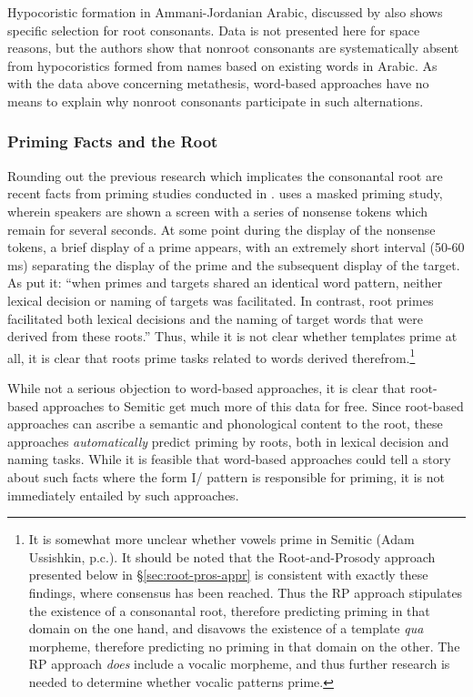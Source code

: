 \documentclass[12pt,twoside,letterpaper]{article}
\begin{document}
Hypocoristic formation in Ammani-Jordanian Arabic, discussed by \cite{davis01} also shows specific selection for root consonants. Data is not presented here for space reasons, but the authors show that nonroot consonants are systematically absent from hypocoristics formed from names based on existing words in Arabic. As with the data above concerning metathesis, word-based approaches have no means to explain why nonroot consonants participate in such alternations.

\subsubsection{Priming Facts and the Root}
\label{sec:priming-facts-root}

Rounding out the previous research which implicates the consonantal root are recent facts from priming studies conducted in \cite{frost97,deutsch98}. \cite{frost97} uses a masked priming study, wherein speakers are shown a screen with a series of nonsense tokens which remain for several seconds. At some point during the display of the nonsense tokens, a brief display of a prime appears, with an extremely short interval (50-60 ms) separating the display of the prime and the subsequent display of the target. As \cite[p.1]{frost97} put it: ``when primes and targets shared an identical word pattern, neither lexical decision or naming of targets was facilitated. In contrast, root primes facilitated both lexical decisions and the naming of target words that were derived from these roots.'' Thus, while it is not clear whether templates prime at all, it is clear that roots prime tasks related to words derived therefrom.\footnote{It is somewhat more unclear whether vowels prime in Semitic (Adam Ussishkin, p.c.). It should be noted that the Root-and-Prosody approach presented below in \S{\ref{sec:root-pros-appr}} is consistent with exactly these findings, where consensus has been reached. Thus the RP approach stipulates the existence of a consonantal root, therefore predicting priming in that domain on the one hand, and disavows the existence of a template \emph{qua} morpheme, therefore predicting no priming in that domain on the other. The RP approach \emph{does} include a vocalic morpheme, and thus further research is needed to determine whether vocalic patterns prime.}

While not a serious objection to word-based approaches, it is clear that root-based approaches to Semitic get much more of this data for free. Since root-based approaches can ascribe a semantic and phonological content to the root, these approaches \emph{automatically} predict priming by roots, both in lexical decision and naming tasks. While it is feasible that word-based approaches could tell a story about such facts where the form I/{\em{}} pattern is responsible for priming, it is not immediately entailed by such approaches.
\end{document}
